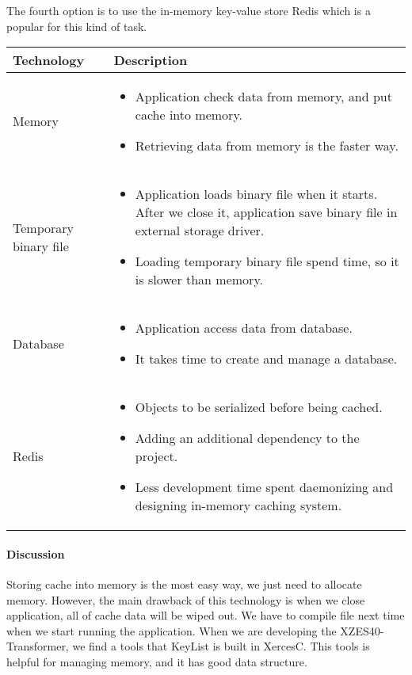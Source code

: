 The fourth option is to use the in-memory key-value store Redis \cite{redis} which is a popular for this kind of task.

\begin{center}
    \begin{tabular}{ | l | p{10cm} |}
    \hline
    Technology & Description  \\ \hline
    Memory&
    \begin{itemize}
      \item Application check data from memory, and put cache into memory.
      \item Retrieving data from memory is the faster way.
    \end{itemize}\\ \hline
    Temporary binary file&
    \begin{itemize}
      \item Application loads binary file when it starts. After we close it, application save binary file in external storage driver.
      \item Loading temporary binary file spend time, so it is slower than memory.
    \end{itemize}\\ \hline
    Database &
    \begin{itemize}
      \item Application access data from database.
      \item It takes time to create and manage a database.
    \end{itemize}\\ \hline
    Redis &
    \begin{itemize}
      \item Objects to be serialized before being cached.
      \item Adding an additional dependency to the project.
      \item Less development time spent daemonizing and designing in-memory caching system.
    \end{itemize}\\ \hline
    \end{tabular}
\end{center}

\paragraph{Discussion}

Storing cache into memory is the most easy way, we just need to allocate memory.
However, the main drawback of this technology is when we close application, all of cache data will be wiped out.
We have to compile file next time when we start running the application.
When we are developing the XZES40-Transformer, we find a tools that KeyList is built in XercesC.
This tools is helpful for managing memory, and it has good data structure.

